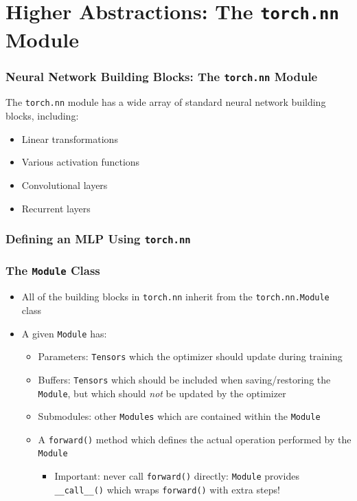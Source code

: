 \documentclass[xcolor={x11names,table}]{beamer}
\begin{document}
\section{Higher Abstractions: The \lstinline!torch.nn! Module}

\begin{frame}
	\frametitle{Neural Network Building Blocks: The \lstinline!torch.nn! Module}
	The \lstinline!torch.nn! module has a wide array of standard neural network building blocks, including:
	\begin{itemize}
		\item Linear transformations
		\item Various activation functions
		\item Convolutional layers
		\item Recurrent layers
	\end{itemize}
\end{frame}

\begin{frame}
	\frametitle{Defining an MLP Using \lstinline!torch.nn!}
	
\end{frame}

\begin{frame}
	\frametitle{The \lstinline!Module! Class}
	\begin{itemize}
		\item All of the building blocks in \lstinline!torch.nn! inherit from the \lstinline!torch.nn.Module! class
		\item A given \lstinline!Module! has:
		\begin{itemize}
			\item Parameters: \lstinline!Tensors! which the optimizer should update during training
			\item Buffers: \lstinline!Tensors! which should be included when saving/restoring the \lstinline!Module!, but which should \emph{not} be updated by the optimizer
			\item Submodules: other \lstinline!Modules! which are contained within the \lstinline!Module!
			\item A \lstinline!forward()! method which defines the actual operation performed by the \lstinline!Module!
			\begin{itemize}
				\item Important: never call \lstinline!forward()! directly: \lstinline!Module! provides \lstinline!__call__()! which wraps \lstinline!forward()! with extra steps!
			\end{itemize}
		\end{itemize}
	\end{itemize}
\end{frame}
\end{document}
